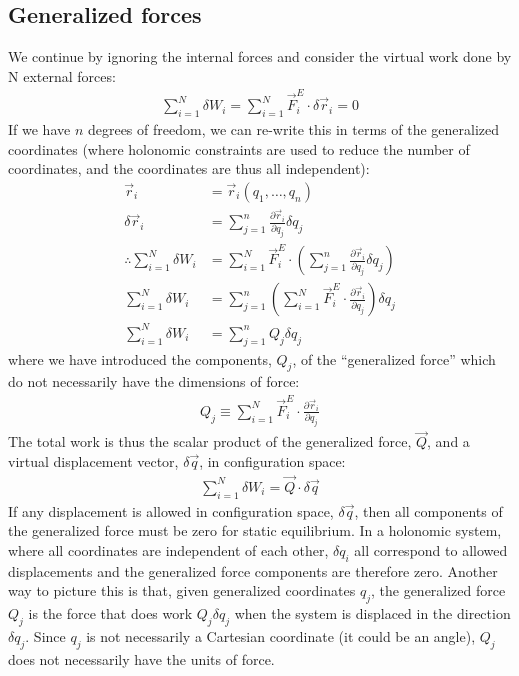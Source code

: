 \subsection{Generalized forces}
We continue by ignoring the internal forces and consider the virtual work done by N external forces:
\begin{align}
\sum_{i=1}^N\delta W_i=\sum_{i=1}^N \vec{F}^E_i\cdot\delta\vec{r}_i = 0 
\end{align}
If we have $n$ degrees of freedom, we can re-write this in terms of the generalized coordinates (where holonomic constraints are used to reduce the number of coordinates, and the coordinates are thus all independent):
\begin{align}
\vec{r}_i&=\vec{r}_i(q_1,\dots , q_n)\nonumber\\
\delta \vec{r}_i&= \sum_{j=1}^n\frac{\partial\vec{r}_i}{\partial q_j}\delta q_j\nonumber\\
\therefore \sum_{i=1}^N\delta W_i&=\sum_{i=1}^N\vec{F}^E_i\cdot\left(\sum_{j=1}^n\frac{\partial\vec{r}_i}{\partial q_j}\delta q_j\right)\nonumber\\
\sum_{i=1}^N\delta W_i&=\sum_{j=1}^n\left(\sum_{i=1}^N\vec{F}^E_i\cdot\frac{\partial\vec{r}_i}{\partial q_j}\right)\delta q_j\nonumber\\
\sum_{i=1}^N\delta W_i&=\sum_{j=1}^nQ_j\delta q_j\nonumber
\end{align}
where we have introduced the components, $Q_j$, of the ``generalized force'' which do not necessarily have the dimensions of force:
\begin{align}
Q_j\equiv \sum_{i=1}^N\vec{F}^E_i\cdot\frac{\partial\vec{r}_i}{\partial q_j}
\label{eqn:genforce}
\end{align}
The total work is thus the scalar product of the generalized force, $\vec Q$, and a virtual displacement vector, $\delta \vec q$, in configuration space:
\begin{align}
\sum_{i=1}^N\delta W_i=\vec{Q}\cdot\delta\vec{q}
\end{align}
If any displacement is allowed in configuration space, $\delta \vec{q}$, then all components of the generalized force must be zero for static equilibrium. In a holonomic system, where all coordinates are independent of each other, $\delta {q}_i$ all correspond to allowed displacements and the generalized force components are therefore zero. Another way to picture this is that, given generalized coordinates $q_j$, the generalized force $Q_j$ is the force that does work $Q_j \delta q_j$ when the system is displaced in the direction $\delta q_j$. Since $q_j$ is not necessarily a Cartesian coordinate (it could be an angle),  $Q_j$ does not necessarily have the units of force.

